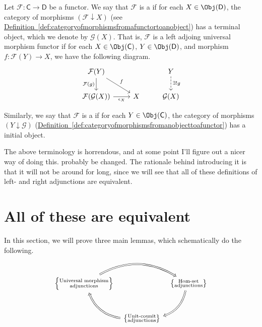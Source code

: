 \documentclass[main.tex]{subfiles}
\begin{document}
\begin{definition}
  \label{def:universal_morphism_adjunction}
  Let $\mathcal{F}\colon \mathsf{C} \to \mathsf{D}$ be a functor. We say that $\mathcal{F}$ is a  if for each $X \in \Obj(\mathsf{D})$, the category of morphisms $(\mathcal{F} \downarrow X)$ (see \hyperref[def:categoryofmorphismsfromafunctortoanobject]{Definition~\ref*{def:categoryofmorphismsfromafunctortoanobject}}) has a terminal object, which we denote by $\mathcal{G}(X)$. That is, $\mathcal{F}$ is a left adjoing universal morphism functor if for each $X \in \Obj(\mathsf{C})$, $Y \in \Obj(\mathsf{D})$, and morphism $f\colon \mathcal{F}(Y) \to X$, we have the following diagram.
  \begin{equation*}
    \begin{tikzcd}
      \mathcal{F}(Y)
      \arrow[rd, "f"]
      \arrow[d, swap, "\mathcal{F}(g)"]
      & & Y
      \arrow[d, dashed, "\exists!g"]
      \\
      \mathcal{F}(\mathcal{G}(X))
      \arrow[r, swap, "\epsilon_{X}"]
      & X
      & \mathcal{G}(X)
    \end{tikzcd}
  \end{equation*}

  Similarly, we say that $\mathcal{F}$ is a  if for each $Y \in \Obj(\mathsf{C})$, the category of morphisms $(Y \downarrow \mathcal{G})$ (\hyperref[def:categoryofmorphismsfromanobjecttoafunctor]{Definition~\ref*{def:categoryofmorphismsfromanobjecttoafunctor}}) has a initial object.
\end{definition}

The above terminology is horrendous, and at some point I'll figure out a nicer way of doing this. probably be changed. The rationale behind introducing it is that it will not be around for long, since we will see that all of these definitions of left- and right adjunctions are equivalent.

\section{All of these are equivalent}
\label{sec:unit_counit_adjunctions_are_hom_set_adjunctions}

In this section, we will prove three main lemmas, which schematically do the following.
\begin{equation*}
  \begin{tikzcd}[row sep=large, column sep=tiny]
    \left\{\substack{\text{Universal morphism}\\\text{adjunctions}}\right\}
    \arrow[rr, bend left, Rightarrow]
    && \left\{\substack{\text{Hom-set}\\\text{adjunctions}}\right\}
    \arrow[dl, bend left, Rightarrow]
    \\
    & \left\{ \substack{\text{Unit-counit}\\\text{adjunctions}} \right\}
    \arrow[ul, bend left, Rightarrow]
  \end{tikzcd}
\end{equation*}
\end{document}
